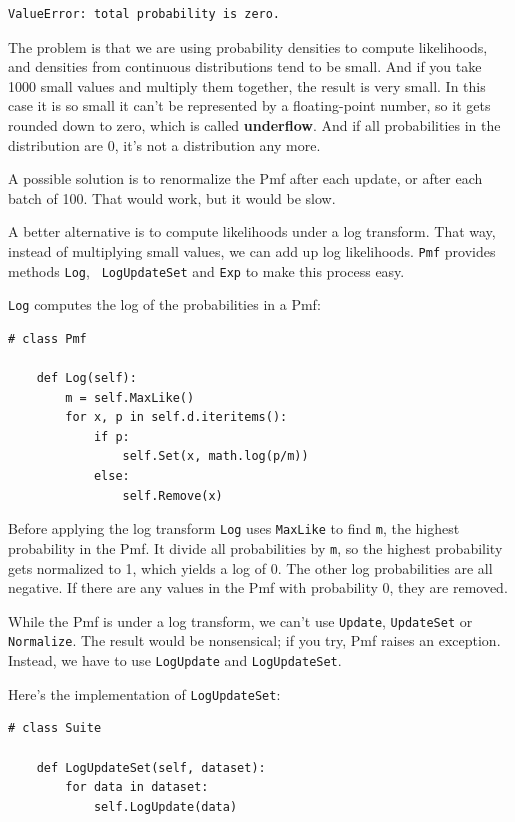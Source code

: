\documentclass[12pt]{book}
\begin{document}
\begin{verbatim}
ValueError: total probability is zero.
\end{verbatim}

The problem is that we are using probability densities to compute
likelihoods, and densities from continuous distributions tend to be
small.  And if you take 1000 small values and multiply
them together, the result is very small.  In this case it is so small
it can't be represented by a floating-point number, so it gets rounded
down to zero, which is called {\bf underflow}.  And if all
probabilities in the distribution are 0, it's not a distribution any
more.

A possible solution is to renormalize the Pmf after each update,
or after each batch of 100.  That would work, but it would be slow.

A better alternative is to compute likelihoods under a log
transform.  That way, instead of multiplying small values, we can add
up log likelihoods.  {\tt Pmf} provides methods {\tt Log}, {\tt
  LogUpdateSet} and {\tt Exp} to make this process easy.

{\tt Log} computes the log of the probabilities in a Pmf:

\begin{verbatim}
# class Pmf

    def Log(self):
        m = self.MaxLike()
        for x, p in self.d.iteritems():
            if p:
                self.Set(x, math.log(p/m))
            else:
                self.Remove(x)
\end{verbatim}

Before applying the log transform {\tt Log} uses {\tt MaxLike} to find
{\tt m}, the highest probability in the Pmf.  It divide all
probabilities by {\tt m}, so the highest probability gets normalized
to 1, which yields a log of 0.  The other log probabilities are all
negative.  If there are any values in the Pmf with probability 0, they
are removed.

While the Pmf is under a log transform, we can't use {\tt Update},
{\tt UpdateSet} or {\tt Normalize}.  The result would be nonsensical;
if you try, Pmf raises an exception.
Instead, we have to use {\tt LogUpdate}
and {\tt LogUpdateSet}.  

Here's the implementation of {\tt LogUpdateSet}:

\begin{verbatim}
# class Suite

    def LogUpdateSet(self, dataset):
        for data in dataset:
            self.LogUpdate(data)
\end{verbatim}
\end{document}
